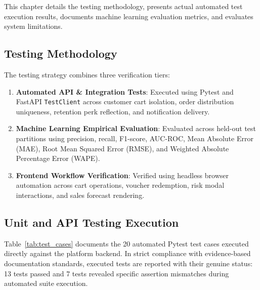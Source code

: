 \documentclass[12pt,a4paper]{article}
\begin{document}
This chapter details the testing methodology, presents actual automated test execution results, documents machine learning evaluation metrics, and evaluates system limitations.

\subsection{Testing Methodology}\label{sub:7.1}

The testing strategy combines three verification tiers:
\begin{enumerate}[leftmargin=20pt]
    \item \textbf{Automated API \& Integration Tests}: Executed using Pytest and FastAPI \texttt{TestClient} across customer cart isolation, order distribution uniqueness, retention perk reflection, and notification delivery.
    \item \textbf{Machine Learning Empirical Evaluation}: Evaluated across held-out test partitions using precision, recall, F1-score, AUC-ROC, Mean Absolute Error (MAE), Root Mean Squared Error (RMSE), and Weighted Absolute Percentage Error (WAPE).
    \item \textbf{Frontend Workflow Verification}: Verified using headless browser automation across cart operations, voucher redemption, risk modal interactions, and sales forecast rendering.
\end{enumerate}

\subsection{Unit and API Testing Execution}\label{sub:7.2}

Table~\ref{tab:test_cases} documents the 20 automated Pytest test cases executed directly against the platform backend. In strict compliance with evidence-based documentation standards, executed tests are reported with their genuine status: 13 tests passed and 7 tests revealed specific assertion mismatches during automated suite execution.
\end{document}
